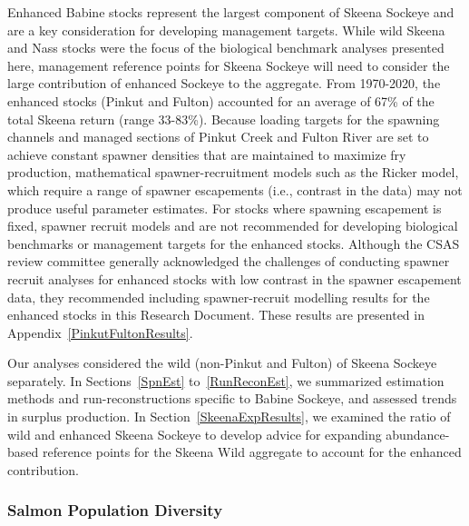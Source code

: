 \documentclass[french,11pt]{book}
\begin{document}
Enhanced Babine stocks represent the largest component of Skeena Sockeye and are a key consideration for developing management targets. While wild Skeena and Nass stocks were the focus of the biological benchmark analyses presented here, management reference points for Skeena Sockeye will need to consider the large contribution of enhanced Sockeye to the aggregate. From 1970-2020, the enhanced stocks (Pinkut and Fulton) accounted for an average of 67\% of the total Skeena return (range 33-83\%). Because loading targets for the spawning channels and managed sections of Pinkut Creek and Fulton River are set to achieve constant spawner densities that are maintained to maximize fry production, mathematical spawner-recruitment models such as the Ricker model, which require a range of spawner escapements (i.e., contrast in the data) may not produce useful parameter estimates. For stocks where spawning escapement is fixed, spawner recruit models and are not recommended for developing biological benchmarks or management targets for the enhanced stocks. Although the CSAS review committee generally acknowledged the challenges of conducting spawner recruit analyses for enhanced stocks with low contrast in the spawner escapement data, they recommended including spawner-recruit modelling results for the enhanced stocks in this Research Document. These results are presented in Appendix~\ref{PinkutFultonResults}.

Our analyses considered the wild (non-Pinkut and Fulton) of Skeena Sockeye separately. In Sections~\ref{SpnEst} to~\ref{RunReconEst}, we summarized estimation methods and run-reconstructions specific to Babine Sockeye, and assessed trends in surplus production. In Section~\ref{SkeenaExpResults}, we examined the ratio of wild and enhanced Skeena Sockeye to develop advice for expanding abundance-based reference points for the Skeena Wild aggregate to account for the enhanced contribution.

\subsubsection{Salmon Population Diversity}\label{salmon-population-diversity}
\end{document}
